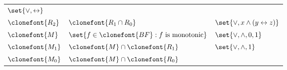\documentclass[11pt]{article}
\begin{document}
\begin{figure}[hbtp]
\begin{small}
\begin{longtable}[]{p{}p{}p{}}
\begin{minipage}[t]{0.38\columnwidth}
                \(\set{\lor,\leftrightarrow}\)\strut
            \end{minipage}\tabularnewline
            \begin{minipage}[t]{0.12\columnwidth}\raggedright
                \(\clonefont{R_2}\)\strut
            \end{minipage} & \begin{minipage}[t]{0.41\columnwidth}\raggedright
                \(\clonefont{R_1 \cap R_0}\)\strut
            \end{minipage} & \begin{minipage}[t]{0.38\columnwidth}\raggedright
                \(\set{\lor, x \land (y \leftrightarrow z)}\)\strut
            \end{minipage}\tabularnewline
            \begin{minipage}[t]{0.12\columnwidth}\raggedright
                \(\clonefont{M}\)\strut
            \end{minipage} & \begin{minipage}[t]{0.41\columnwidth}\raggedright
                \(\set{f \in \clonefont{BF} : f \text{ is monotonic}}\)\strut
            \end{minipage} & \begin{minipage}[t]{0.38\columnwidth}\raggedright
                \(\set{\lor,\land,0,1}\)\strut
            \end{minipage}\tabularnewline
            \begin{minipage}[t]{0.12\columnwidth}\raggedright
                \(\clonefont{M_1}\)\strut
            \end{minipage} & \begin{minipage}[t]{0.41\columnwidth}\raggedright
                \(\clonefont{M} \cap \clonefont{R_1}\)\strut
            \end{minipage} & \begin{minipage}[t]{0.38\columnwidth}\raggedright
                \(\set{\lor,\land,1}\)\strut
            \end{minipage}\tabularnewline
            \begin{minipage}[t]{0.12\columnwidth}\raggedright
                \(\clonefont{M_0}\)\strut
            \end{minipage} & \begin{minipage}[t]{0.41\columnwidth}\raggedright
                \(\clonefont{M} \cap \clonefont{R_0}\)\strut
            \end{minipage} & \begin{minipage}[t]{0.38\columnwidth}\raggedright

\end{minipage}
\end{longtable}
\end{small}
\end{figure}
\end{document}
